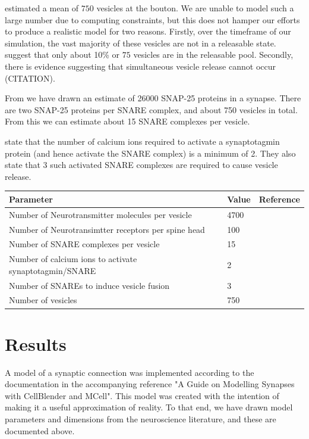 \documentclass[a4paper]{article}
\begin{document}
\cite{Rollehagen::2015} estimated a mean of $750$ vesicles at the bouton. We are unable to model such a large number due to computing constraints, but this does not hamper our efforts to produce a realistic model for two reasons. Firstly, over the timeframe of our simulation, the vast majority of these vesicles are not in a releasable state. \cite{rizzoli2005synaptic} suggest that only about 10\% or $75$ vesicles are in the releasable pool. Secondly, there is evidence suggesting that simultaneous vesicle release cannot occur (CITATION).

From \cite{Wilhelm:Science:2014} we have drawn an estimate of 26000 SNAP-25 proteins in a synapse. There are two SNAP-25 proteins per SNARE complex, and about 750 vesicles in total. From this we can estimate about 15 SNARE complexes per vesicle. 

\cite{Dittrich:BiophysJ:2013} state that the number of calcium ions required to activate a synaptotagmin protein (and hence activate the SNARE complex) is a minimum of 2. They also state that 3 such activated SNARE complexes are required to cause vesicle release. 

\begin{table}[H]
\begin{tabular}{lll}
Parameter & Value & Reference \\ \hline
Number of Neurotransmitter molecules per vesicle & 4700&\cite{Bruns:Nature:1995} \\
Number of Neurotransimtter receptors per spine head & 100 & \cite{Stricker:JPhysiol:1996} \\
Number of SNARE complexes per vesicle & 15 & \cite{Wilhelm:Science:2014} \\ 
Number of calcium ions to activate synaptotagmin/SNARE & 2 & \cite{Dittrich:BiophysJ:2013} \\
Number of SNAREs to induce vesicle fusion & 3 & \cite{Dittrich:BiophysJ:2013} \\  
Number of vesicles & 750 & \cite{Rollehagen::2015}\\
\end{tabular}
\end{table}

\section{Results}
A model of a synaptic connection was implemented according to the documentation in the accompanying reference "A Guide on Modelling Synapses with CellBlender and MCell". This model was created with the intention of making it a useful approximation of reality. To that end, we have drawn model parameters and dimensions from the neuroscience literature, and these are documented above.
\end{document}
